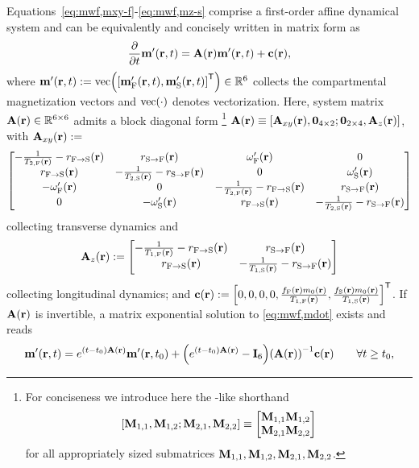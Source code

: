 Equations~\eqref{eq:mwf,mxy-f}-\eqref{eq:mwf,mz-s}
comprise a first-order affine dynamical system
and can be equivalently and concisely written
in matrix form as
\begin{align}
	\dela{t} \bmmp\prt = \bmA\pr \bmmp\prt + \bmc\pr,
	\label{eq:mwf,mdot}
\end{align}	
where $\bmmp\prt := \vect{\brac{\bmmpf\prt, \bmmps\prt}\tpose} \in \reals{6}$
collects the compartmental magnetization vectors
and $\vect{\cdot}$ denotes vectorization.
Here,
system matrix $\bmA\pr \in \reals{6 \times 6}$ 
admits a block diagonal form
\footnote{For conciseness we introduce here 
	the \matlab-like shorthand 
	$$\brac{\bmM_{1,1}, \bmM_{1,2}; \bmM_{2,1}, \bmM_{2,2}} 
		\equiv
		\begin{bmatrix}
			\bmM_{1,1} \bmM_{1,2} \\
			\bmM_{2,1} \bmM_{2,2}
		\end{bmatrix}$$
	for all appropriately sized submatrices 
	$\mathbf{M}_{1,1}, \mathbf{M}_{1,2}, \mathbf{M}_{2,1}, \mathbf{M}_{2,2}$.
}
$\bmA\pr \equiv \brac{\bmAxy\pr, \zeros{4 \times 2}; \zeros{2 \times 4}, \bmAz\pr}$,
with $\bmAxy\pr :=$
\begin{align}
	\begin{bmatrix}
		-\frac{1}{\tf{2}\pr}-\rfs\pr & \rsf\pr & \ompf\pr & 0 \\
		\rfs\pr & -\frac{1}{\ts{2}\pr}-\rsf\pr & 0 & \omps\pr \\
		-\ompf\pr & 0 & -\frac{1}{\tf{2}\pr}-\rfs\pr & \rsf\pr \\
		0 & -\omps\pr & \rfs\pr & -\frac{1}{\ts{2}\pr}-\rsf\pr 
	\end{bmatrix}
	\label{eq:mwf,Axy}
\end{align}
collecting transverse dynamics and
\begin{align}
	\bmAz\pr :=
	\begin{bmatrix}
		-\frac{1}{\tf{1}\pr}-\rfs\pr & \rsf\pr \\
		\rfs\pr & -\frac{1}{\ts{1}\pr}-\rsf\pr
		\label{eq:mwf,Az}
	\end{bmatrix}
\end{align}
collecting longitudinal dynamics; and
$\bmc\pr := \brac{0, 0, 0, 0, 
\frac{\ff\pr \mzero\pr}{\tf{1}\pr}, 
\frac{\fs\pr \mzero\pr}{\ts{1}\pr}}\tpose$.
If $\bmA\pr$ is invertible,
a matrix exponential solution 
to \eqref{eq:mwf,mdot}
exists and reads
\begin{align}
	\bmmp\prt = e^{\paren{t-t_0}\bmA\pr} \bmmp\prtz +
		\paren{e^{\paren{t-t_0}\bmA\pr} - \eye{6}} \inv{\bmA\pr} \bmc\pr
		\qquad \forall t \geq t_0,
		\label{eq:mwf,epr}
\end{align}
